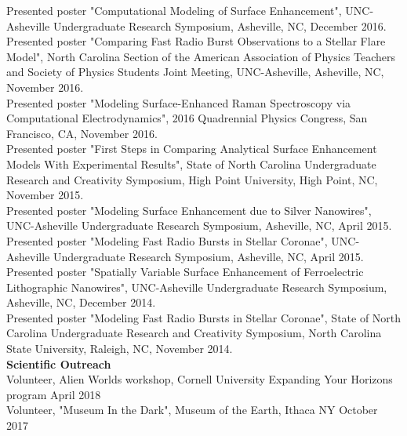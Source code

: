 \documentclass[a4paper, 11pt]{article}
\newcommand{\noi}{\noindent}
\begin{document}
\noi Presented poster "Computational Modeling of Surface Enhancement", UNC-Asheville Undergraduate Research Symposium, Asheville, NC, December 2016.
\\

\noi Presented poster "Comparing Fast Radio Burst Observations to a Stellar Flare Model", North Carolina Section of the American Association of Physics Teachers and Society of Physics Students Joint Meeting, UNC-Asheville, Asheville, NC, November 2016.
\\

\noi Presented poster "Modeling Surface-Enhanced Raman Spectroscopy via Computational Electrodynamics", 2016 Quadrennial Physics Congress, San Francisco, CA, November 2016.
\\

\noi Presented poster "First Steps in Comparing Analytical Surface Enhancement Models With Experimental Results", State of North Carolina Undergraduate Research and Creativity Symposium, High Point University, High Point, NC, November 2015.
\\

\noi Presented poster "Modeling Surface Enhancement due to Silver Nanowires", UNC-Asheville Undergraduate Research Symposium, Asheville, NC, April 2015.
\\

\noi Presented poster "Modeling Fast Radio Bursts in Stellar Coronae", UNC-Asheville Undergraduate Research Symposium, Asheville, NC, April 2015.
\\

\noi Presented poster "Spatially Variable Surface Enhancement of
Ferroelectric Lithographic Nanowires", UNC-Asheville Undergraduate Research Symposium, Asheville, NC, December 2014.
\\

\noi Presented poster "Modeling Fast Radio Bursts in Stellar Coronae", State of North Carolina Undergraduate Research and Creativity Symposium, North Carolina State University, Raleigh, NC, November 2014.
\\

\noi \textbf{Scientific Outreach}
\\

\noi Volunteer, Alien Worlds workshop, Cornell University Expanding Your Horizons program \hfill April 2018
\\

\noi Volunteer, "Museum In the Dark", Museum of the Earth, Ithaca NY \hfill October 2017
\\
\end{document}
